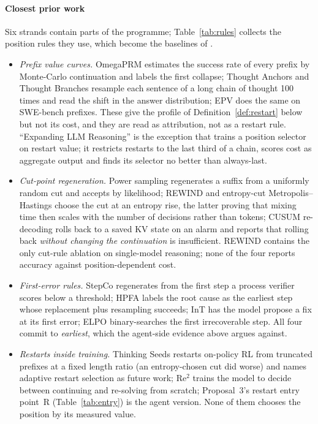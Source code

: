 \documentclass[10pt,a4paper]{article}
\begin{document}
\paragraph{Closest prior work} Six strands contain parts of the programme; Table~\ref{tab:rules} collects the position rules they use, which become the baselines of .
\begin{itemize}[leftmargin=1.1em]
\item \emph{Prefix value curves.} OmegaPRM \cite{luo2024omegaprm} estimates the success rate of every prefix by Monte-Carlo continuation and labels the first collapse; Thought Anchors and Thought Branches \cite{bogdan2025thoughtanchors,macar2025thoughtbranches} resample each sentence of a long chain of thought 100 times and read the shift in the answer distribution; EPV \cite{shen2026epv} does the same on SWE-bench prefixes. These give the profile of Definition~\ref{def:restart} below but not its cost, and they are read as attribution, not as a restart rule. ``Expanding LLM Reasoning'' \cite{atri2026expanding} is the exception that trains a position selector on restart value; it restricts restarts to the last third of a chain, scores cost as aggregate output and finds its selector no better than always-last.
\item \emph{Cut-point regeneration.} Power sampling \cite{karan2026power} regenerates a suffix from a uniformly random cut and accepts by likelihood; REWIND \cite{ding2026rewind} and entropy-cut Metropolis--Hastings \cite{zhou2026entropycut} choose the cut at an entropy rise, the latter proving that mixing time then scales with the number of decisions rather than tokens; CUSUM re-decoding \cite{ettifouri2026cusum} rolls back to a saved KV state on an alarm and reports that rolling back \emph{without changing the continuation} is insufficient. REWIND contains the only cut-rule ablation on single-model reasoning; none of the four reports accuracy against position-dependent cost.
\item \emph{First-error rules.} StepCo \cite{wu2024stepco} regenerates from the first step a process verifier scores below a threshold; HPFA \cite{zhu2026hpfa} labels the root cause as the earliest step whose replacement plus resampling succeeds; InT \cite{yang2026int} has the model propose a fix at its first error; ELPO \cite{liang2026elpo} binary-searches the first irrecoverable step. All four commit to \emph{earliest}, which the agent-side evidence above argues against.
\item \emph{Restarts inside training.} Thinking Seeds \cite{yang2026thinkingseeds} restarts on-policy RL from truncated prefixes at a fixed length ratio (an entropy-chosen cut did worse) and names adaptive restart selection as future work; Re$^2$ \cite{wang2026resolve} trains the model to decide between continuing and re-solving from scratch; Proposal~3's restart entry point~R (Table~\ref{tab:entry}) is the agent version. None of them chooses the position by its measured value.

\end{itemize}
\end{document}
